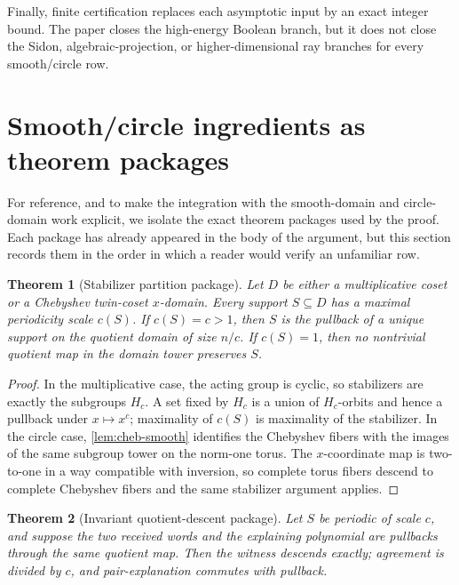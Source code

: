 \documentclass[12pt,a4paper]{amsart}
\numberwithin{equation}{section}
\newtheorem{theorem}{Theorem}[section]
\theoremstyle{remark}
\begin{document}
Finally, finite certification replaces each asymptotic input by an exact
integer bound.  The paper closes the high-energy Boolean branch, but it
does not close the Sidon, algebraic-projection, or higher-dimensional ray
branches for every smooth/circle row.


\section{Smooth/circle ingredients as theorem packages}\label{sec:ingredient-packages}

For reference, and to make the integration with the smooth-domain and circle-domain work explicit, we isolate the exact theorem packages used by the proof.  Each package has already appeared in the body of the argument, but this section records them in the order in which a reader would verify an unfamiliar row.

\begin{theorem}[Stabilizer partition package]\label{thm:stabilizer-package}
Let \(D\) be either a multiplicative coset or a Chebyshev twin-coset \(x\)-domain.  Every support \(S\subseteq D\) has a maximal periodicity scale \(c(S)\).  If \(c(S)=c>1\), then \(S\) is the pullback of a unique support on the quotient domain of size \(n/c\).  If \(c(S)=1\), then no nontrivial quotient map in the domain tower preserves \(S\).
\end{theorem}

\begin{proof}
In the multiplicative case, the acting group is cyclic, so stabilizers are exactly the subgroups \(H_c\).  A set fixed by \(H_c\) is a union of \(H_c\)-orbits and hence a pullback under \(x\mapsto x^c\); maximality of \(c(S)\) is maximality of the stabilizer.  In the circle case, \cref{lem:cheb-smooth} identifies the Chebyshev fibers with the images of the same subgroup tower on the norm-one torus.  The \(x\)-coordinate map is two-to-one in a way compatible with inversion, so complete torus fibers descend to complete Chebyshev fibers and the same stabilizer argument applies.
\end{proof}

\begin{theorem}[Invariant quotient-descent package]\label{thm:exact-descent-package}
Let \(S\) be periodic of scale \(c\), and suppose the two received words
and the explaining polynomial are pullbacks through the same quotient map.
Then the witness descends exactly; agreement is divided by \(c\), and
pair-explanation commutes with pullback.
\end{theorem}
\end{document}
